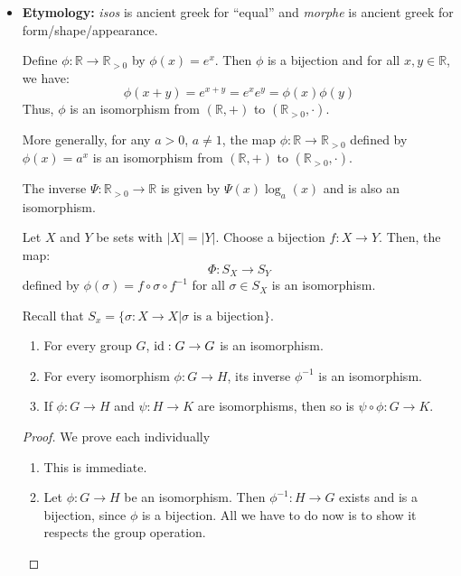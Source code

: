 \begin{itemize}
\begin{definition}
    \end{definition}
    \item \textbf{Etymology:} \textit{isos} is ancient greek for ``equal'' and \textit{morphe} is ancient greek for form/shape/appearance.
    \begin{example}
        Define $\phi: \mathbb{R} \rightarrow \mathbb{R}_{>0}$ by $\phi(x)=e^x$. Then $\phi$ is a bijection and for all $x,y\in \mathbb{R}$, we have:
        \begin{equation}
            \phi(x+y)=e^{x+y}=e^xe^y = \phi(x)\phi(y)
        \end{equation}
        Thus, $\phi$ is an isomorphism from $(\mathbb{R},+)$ to $(\mathbb{R}_{>0},\cdot)$.
        \vspace{2mm}

        More generally, for any $a>0$, $a\neq 1$, the map $\phi:\mathbb{R} \rightarrow \mathbb{R}_{>0}$ defined by $\phi(x)=a^x$ is an isomorphism from $(\mathbb{R},+)$ to $(\mathbb{R}_{>0},\cdot)$.
        \vspace{2mm}

        The inverse $\Psi: \mathbb{R}_{>0}\rightarrow \mathbb{R}$ is given by $\Psi(x)  \log_a(x)$ and is also an isomorphism.
    \end{example}
    \begin{example}
        Let $X$ and $Y$ be sets with $|X|=|Y|$. Choose a bijection $f:X\rightarrow Y$. Then, the map:
        \begin{equation}
            \Phi: S_X \rightarrow S_Y
        \end{equation}
        defined by $\phi(\sigma) = f \circ \sigma \circ f^{-1}$ for all $\sigma \in S_X$ is an isomorphism.
        \vspace{2mm}

        Recall that $S_x = \{\sigma:X\rightarrow X| \sigma\text{ is a bijection}\}$.
    \end{example}
    \begin{lemma}
        \begin{enumerate}
            \item For every group $G$, $\text{id}:G\rightarrow G$ is an isomorphism.
            \item For every isomorphism $\phi: G \rightarrow H$, its inverse $\phi^{-1}$ is an isomorphism.
            \item If $\phi: G\rightarrow H$ and $\psi: H\to K$ are isomorphisms, then so is $\psi \circ \phi: G \rightarrow K$.
        \end{enumerate}
    \end{lemma}
    \begin{proof}
        We prove each individually
        \begin{enumerate}
            \item This is immediate.
            \item Let $\phi:G\rightarrow H$ be an isomorphism. Then $\phi^{-1}:H\rightarrow G$ exists and is a bijection, since $\phi$ is a bijection. All we have to do now is to show it respects the group operation.
            

\end{enumerate}
\end{proof}
\end{itemize}

